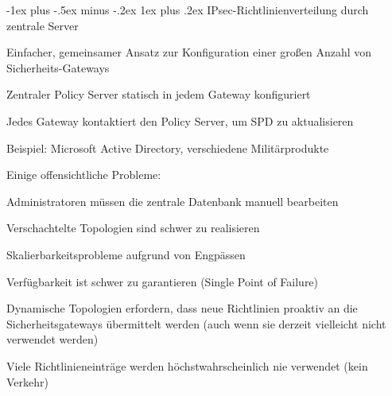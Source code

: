 \documentclass[a4paper]{article}
\makeatletter
\renewcommand{\subsubsection}{\@startsection{subsubsection}{3}{0mm}%
 {-1ex plus -.5ex minus -.2ex}%
 {1ex plus .2ex}%
 {\normalfont\small\bfseries}}
\makeatother
\begin{document}
\begin{multicols}{3}
\begin{itemize*}
            \subsubsection{IPsec-Richtlinienverteilung durch zentrale
                  Server}
            \begin{itemize*}
                  \item       Einfacher, gemeinsamer Ansatz zur Konfiguration einer großen Anzahl
                  von Sicherheits-Gateways
                  \item       Zentraler Policy Server statisch in jedem Gateway konfiguriert
                  \item       Jedes Gateway kontaktiert den Policy Server, um SPD zu aktualisieren
                  \item       Beispiel: Microsoft Active Directory, verschiedene Militärprodukte
                  \item       Einige offensichtliche Probleme:
                  \begin{itemize*}
                        \item Administratoren müssen die zentrale Datenbank manuell bearbeiten
                        \item Verschachtelte Topologien sind schwer zu realisieren
                        \item Skalierbarkeitsprobleme aufgrund von Engpässen
                        \item Verfügbarkeit ist schwer zu garantieren (Single Point of Failure)
                        \item Dynamische Topologien erfordern, dass neue Richtlinien proaktiv an die Sicherheitsgateways übermittelt werden (auch wenn sie derzeit vielleicht nicht verwendet werden)
                        \item Viele Richtlinieneinträge werden höchstwahrscheinlich nie verwendet (kein Verkehr)
                  \end{itemize*}
            \end{itemize*}


\end{itemize*}
\end{multicols}
\end{document}

